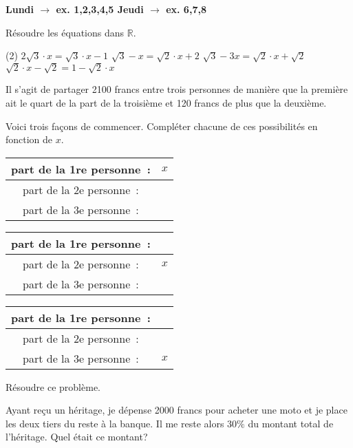 \documentclass[a4paper,12pt]{report}
\begin{document}
{\bfseries Lundi $\longrightarrow$ ex. 1,2,3,4,5  \hfill Jeudi $\longrightarrow$ ex. 6,7,8}


\begin{exo}[2]
Résoudre les équations dans $\mathbb{R}$.
\begin{tasks}(2)
\task $2 \sqrt{3} \cdot x=\sqrt{3} \cdot x-1$
\task $\sqrt{3}-x=\sqrt{2} \cdot x+2$
\task $\sqrt{3}-3 x=\sqrt{2} \cdot x+\sqrt{2}$
\task $\sqrt{2} \cdot x-\sqrt{2}=1-\sqrt{2} \cdot x$
\end{tasks}
\end{exo}

\begin{exo}[1]
	Il s'agit de partager 2100 francs entre trois personnes de manière que la première ait le quart de la part de la troisième et 120 francs de plus que la deuxième.
	\begin{tasks}
		\task Voici trois façons de commencer. Compléter chacune de ces possibilités en fonction de $x$.

\begin{tabular}{|c|c|}
\hline part de la 1re personne~: & $x$ \\
\hline part de la 2e personne~: & \\ 
\hline part de la 3e personne~: &\\ 
\hline
\end{tabular}
\begin{tabular}{|c|c|}
\hline part de la 1re personne~: & \\
\hline part de la 2e personne~: & $x$ \\ 
\hline part de la 3e personne~: &\\ 
\hline
\end{tabular}
\begin{tabular}{|c|c|}
\hline part de la 1re personne~: &  \\
\hline part de la 2e personne~: & \\ 
\hline part de la 3e personne~: &$x$\\ 
\hline
\end{tabular}
\task Résoudre ce problème.
	\end{tasks}
\end{exo}

\begin{exo}[2]
Ayant reçu un héritage, je dépense 2000 francs pour acheter une moto et je place les deux tiers du reste à la banque. Il me reste alors $30 \%$ du montant total de l'héritage. Quel était ce montant?
\end{exo}
\end{document}
